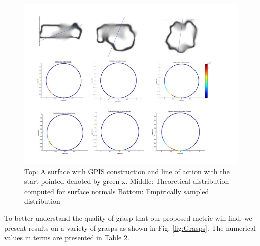 \documentclass[letterpaper, 10 pt, conference]{ieeeconf}  %
\begin{document}
\begin{figure}[ht!]
\centering
\includegraphics[scale = 0.3]{figures/Slide08.jpg}
\caption{Top: A surface with GPIS construction and line of action with the start pointed denoted by green x.
Middle: Theoretical distribution computed for surface normals
Bottom: Empirically sampled distribution}
\vspace*{-10pt}
\label{fig:Normal_Dist}
\end{figure}

To better understand the quality of grasp that our proposed metric will find, we present results on a variety of grasps as shown in Fig. \ref{fig:Grasps}. The numerical values in terms are presented in Table 2. 
\end{document}
